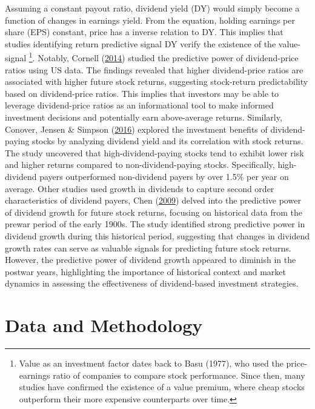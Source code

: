 \documentclass[11pt,preprint, authoryear]{elsarticle}
\numberwithin{equation}{section}
\numberwithin{figure}{section}
\numberwithin{table}{section}
\let\rmarkdownfootnote\footnote%
\def\footnote{\protect\rmarkdownfootnote}
\begin{document}
Assuming a constant payout ratio, dividend yield (DY) would simply
become a function of changes in earnings yield. From the equation,
holding earnings per share (EPS) constant, price has a inverse relation
to DY. This implies that studies identifying return predictive signal DY
verify the existence of the value-signal \footnote{Value as an
  investment factor dates back to Basu (1977), who used the
  price-earnings ratio of companies to compare stock performance. Since
  then, many studies have confirmed the existence of a value premium,
  where cheap stocks outperform their more expensive counterparts over
  time.}. Notably, Cornell
(\protect\hyperlink{ref-cornell2014dividend}{2014}) studied the
predictive power of dividend-price ratios using US data. The findings
revealed that higher dividend-price ratios are associated with higher
future stock returns, suggesting stock-return predictability based on
dividend-price ratios. This implies that investors may be able to
leverage dividend-price ratios as an informational tool to make informed
investment decisions and potentially earn above-average returns.
Similarly, Conover, Jensen \& Simpson
(\protect\hyperlink{ref-conover2016difference}{2016}) explored the
investment benefits of dividend-paying stocks by analyzing dividend
yield and its correlation with stock returns. The study uncovered that
high-dividend-paying stocks tend to exhibit lower risk and higher
returns compared to non-dividend-paying stocks. Specifically,
high-dividend payers outperformed non-dividend payers by over 1.5\% per
year on average. Other studies used growth in dividends to capture
second order characteristics of dividend payers, Chen
(\protect\hyperlink{ref-chen2009reversal}{2009}) delved into the
predictive power of dividend growth for future stock returns, focusing
on historical data from the prewar period of the early 1900s. The study
identified strong predictive power in dividend growth during this
historical period, suggesting that changes in dividend growth rates can
serve as valuable signals for predicting future stock returns. However,
the predictive power of dividend growth appeared to diminish in the
postwar years, highlighting the importance of historical context and
market dynamics in assessing the effectiveness of dividend-based
investment strategies.

\newpage

\hypertarget{data-and-methodology}{%
\section*{Data and Methodology}\label{data-and-methodology}}
\end{document}
